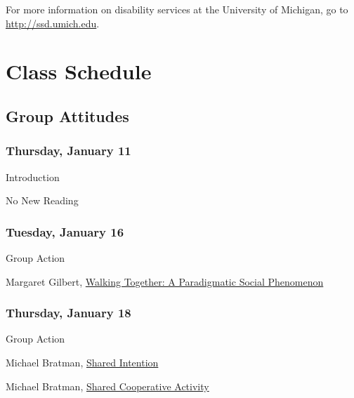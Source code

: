 \documentclass[
  12pt,
  letterpaper,
  DIV=11,
  numbers=noendperiod]{scrartcl}
\providecommand{\tightlist}{%
  \setlength{\itemsep}{0pt}\setlength{\parskip}{0pt}}\usepackage{longtable,booktabs,array}
\begin{document}
For more information on disability services at the University of
Michigan, go to \url{http://ssd.umich.edu}.

\section{Class Schedule}\label{class-schedule}

\subsection{Group Attitudes}\label{group-attitudes}

\subsubsection{Thursday, January 11}\label{thursday-january-11}

\begin{description}
\tightlist
\item[Topic]
Introduction
\item[Reading]
No New Reading
\end{description}

\subsubsection{Tuesday, January 16}\label{tuesday-january-16}

\begin{description}
\tightlist
\item[Topic]
Group Action
\item[Reading]
Margaret Gilbert, \href{https://philpapers.org/rec/GILWTA}{Walking
Together: A Paradigmatic Social Phenomenon}
\end{description}

\subsubsection{Thursday, January 18}\label{thursday-january-18}

\begin{description}
\tightlist
\item[Topic]
Group Action
\item[Reading]
Michael Bratman, \href{https://philpapers.org/rec/BRASI}{Shared
Intention}

Michael Bratman, \href{https://philpapers.org/rec/BRASCA}{Shared
Cooperative Activity}
\end{description}
\end{document}
